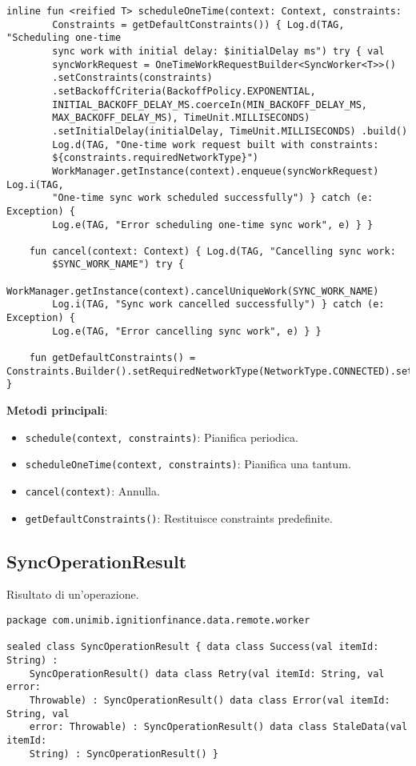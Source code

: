 \begin{lstlisting}[caption=SyncOperationScheduler.kt, label=lst:syncoperationscheduler, basicstyle=\ttfamily\scriptsize, breaklines=true, breakatwhitespace=true, tabsize=4]
    inline fun <reified T> scheduleOneTime(context: Context, constraints:
        Constraints = getDefaultConstraints()) { Log.d(TAG, "Scheduling one-time
        sync work with initial delay: $initialDelay ms") try { val
        syncWorkRequest = OneTimeWorkRequestBuilder<SyncWorker<T>>()
        .setConstraints(constraints)
        .setBackoffCriteria(BackoffPolicy.EXPONENTIAL,
        INITIAL_BACKOFF_DELAY_MS.coerceIn(MIN_BACKOFF_DELAY_MS,
        MAX_BACKOFF_DELAY_MS), TimeUnit.MILLISECONDS)
        .setInitialDelay(initialDelay, TimeUnit.MILLISECONDS) .build()
        Log.d(TAG, "One-time work request built with constraints:
        ${constraints.requiredNetworkType}")
        WorkManager.getInstance(context).enqueue(syncWorkRequest) Log.i(TAG,
        "One-time sync work scheduled successfully") } catch (e: Exception) {
        Log.e(TAG, "Error scheduling one-time sync work", e) } }

    fun cancel(context: Context) { Log.d(TAG, "Cancelling sync work:
        $SYNC_WORK_NAME") try {
        WorkManager.getInstance(context).cancelUniqueWork(SYNC_WORK_NAME)
        Log.i(TAG, "Sync work cancelled successfully") } catch (e: Exception) {
        Log.e(TAG, "Error cancelling sync work", e) } }

    fun getDefaultConstraints() =
Constraints.Builder().setRequiredNetworkType(NetworkType.CONNECTED).setRequiresBatteryNotLow(true).build()
}
\end{lstlisting}

\textbf{Metodi principali}:
\begin{itemize}
    \item \texttt{schedule(context, constraints)}: Pianifica periodica.
    \item \texttt{scheduleOneTime(context, constraints)}: Pianifica una tantum.
    \item \texttt{cancel(context)}: Annulla.
    \item \texttt{getDefaultConstraints()}: Restituisce constraints predefinite.
\end{itemize}

\subsection{SyncOperationResult}\label{subsec:syncoperationresult} Risultato di
un'operazione.

\begin{lstlisting}[caption=SyncOperationResult.kt, label=lst:syncoperationresult, basicstyle=\ttfamily\scriptsize, breaklines=true, breakatwhitespace=true, tabsize=4]
package com.unimib.ignitionfinance.data.remote.worker

sealed class SyncOperationResult { data class Success(val itemId: String) :
    SyncOperationResult() data class Retry(val itemId: String, val error:
    Throwable) : SyncOperationResult() data class Error(val itemId: String, val
    error: Throwable) : SyncOperationResult() data class StaleData(val itemId:
    String) : SyncOperationResult() }
\end{lstlisting}

